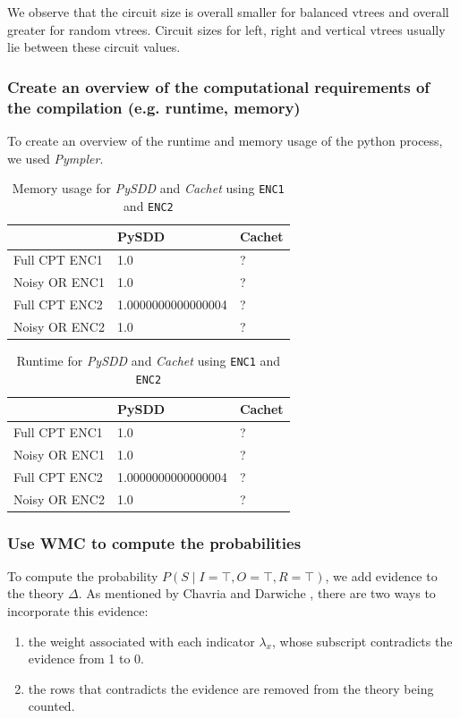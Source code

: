 \documentclass{article}
\begin{document}
We observe that the circuit size is overall smaller for balanced vtrees and overall greater for random vtrees. Circuit sizes for left, right and vertical vtrees usually lie between these circuit values. 

\subsubsection{Create an overview of the computational requirements of the compilation (e.g. runtime, memory)}
To create an overview of the runtime and memory usage of the python process, we used \textit{Pympler}. 

\begin{table}[h]
\centering
\begin{tabular}{l | l l}
					&	PySDD	&		Cachet	\\\hline
	Full CPT ENC1	&	1.0		&		?		\\
	Noisy OR ENC1	&	1.0		&		?		\\
	Full CPT ENC2	&	1.0000000000000004 &	?	\\
	Noisy OR ENC2	&	1.0		&		?		\\
\end{tabular}
\caption{Memory usage for \textit{PySDD} and \textit{Cachet} using \texttt{ENC1} and \texttt{ENC2}}
\label{tab:memory_pysdd_cachet}
\end{table}

\begin{table}[h]
\centering
\begin{tabular}{l | l l}
					&	PySDD	&		Cachet	\\\hline
	Full CPT ENC1	&	1.0		&		?		\\
	Noisy OR ENC1	&	1.0		&		?		\\
	Full CPT ENC2	&	1.0000000000000004 &	?	\\
	Noisy OR ENC2	&	1.0		&		?		\\
\end{tabular}
\caption{Runtime for \textit{PySDD} and \textit{Cachet} using \texttt{ENC1} and \texttt{ENC2}}
\label{tab:runtime_pysdd_cachet}
\end{table}

\subsubsection{Use WMC to compute the probabilities }
To compute the probability $P(S \mid I=\top, O = \top, R = \top)$, we add evidence to the theory $\Delta$. As mentioned by Chavria and Darwiche \cite{chavira}, there are two ways to incorporate this evidence:
\begin{enumerate}
	\item the weight associated with each indicator $\lambda_x$, whose subscript contradicts the evidence from 1 to 0.
	\item the rows that contradicts the evidence are removed from the theory being counted.
\end{enumerate}
\end{document}
